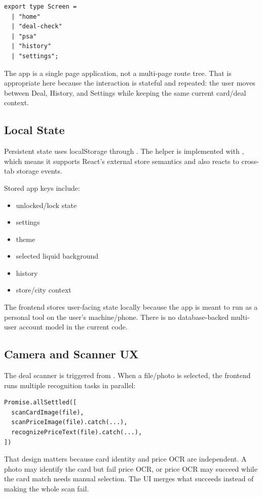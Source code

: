 \documentclass[11pt,a4paper]{article}
\begin{document}
\begin{lstlisting}
export type Screen =
  | "home"
  | "deal-check"
  | "psa"
  | "history"
  | "settings";
\end{lstlisting}

The app is a single page application, not a multi-page route tree. That is appropriate here because the interaction is stateful and repeated: the user moves between Deal, History, and Settings while keeping the same current card/deal context.

\subsection{Local State}

Persistent state uses localStorage through . The helper  is implemented with , which means it supports React's external store semantics and also reacts to cross-tab storage events.

Stored app keys include:

\begin{itemize}
  \item unlocked/lock state
  \item settings
  \item theme
  \item selected liquid background
  \item history
  \item store/city context
\end{itemize}

The frontend stores user-facing state locally because the app is meant to run as a personal tool on the user's machine/phone. There is no database-backed multi-user account model in the current code.

\subsection{Camera and Scanner UX}

The deal scanner is triggered from . When a file/photo is selected, the frontend runs multiple recognition tasks in parallel:

\begin{lstlisting}
Promise.allSettled([
  scanCardImage(file),
  scanPriceImage(file).catch(...),
  recognizePriceText(file).catch(...),
])
\end{lstlisting}

That design matters because card identity and price OCR are independent. A photo may identify the card but fail price OCR, or price OCR may succeed while the card match needs manual selection. The UI merges what succeeds instead of making the whole scan fail.
\end{document}
